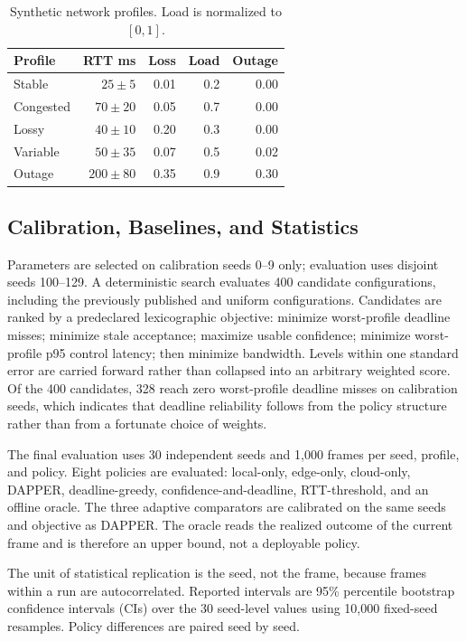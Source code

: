 \documentclass[conference,a4paper]{IEEEtran}
\begin{document}
\begin{table}[t]
\centering
\caption{Synthetic network profiles. Load is normalized to $[0,1]$.}
\label{tab:profiles}
\scriptsize
\renewcommand{\arraystretch}{0.9}
\begin{tabular}{@{}lrrrr@{}}
\toprule
Profile & RTT ms & Loss & Load & Outage \\
\midrule
Stable    & $25\pm5$   & 0.01 & 0.2 & 0.00 \\
Congested & $70\pm20$  & 0.05 & 0.7 & 0.00 \\
Lossy     & $40\pm10$  & 0.20 & 0.3 & 0.00 \\
Variable  & $50\pm35$  & 0.07 & 0.5 & 0.02 \\
Outage    & $200\pm80$ & 0.35 & 0.9 & 0.30 \\
\bottomrule
\end{tabular}
\end{table}

\subsection{Calibration, Baselines, and Statistics}
Parameters are selected on calibration seeds 0--9 only; evaluation uses disjoint seeds 100--129. A deterministic search evaluates 400 candidate configurations, including the previously published and uniform configurations. Candidates are ranked by a predeclared lexicographic objective: minimize worst-profile deadline misses; minimize stale acceptance; maximize usable confidence; minimize worst-profile p95 control latency; then minimize bandwidth. Levels within one standard error are carried forward rather than collapsed into an arbitrary weighted score. Of the 400 candidates, 328 reach zero worst-profile deadline misses on calibration seeds, which indicates that deadline reliability follows from the policy structure rather than from a fortunate choice of weights.

The final evaluation uses 30 independent seeds and 1,000 frames per seed, profile, and policy. Eight policies are evaluated: local-only, edge-only, cloud-only, DAPPER, deadline-greedy, confidence-and-deadline, RTT-threshold, and an offline oracle. The three adaptive comparators are calibrated on the same seeds and objective as DAPPER. The oracle reads the realized outcome of the current frame and is therefore an upper bound, not a deployable policy.

The unit of statistical replication is the seed, not the frame, because frames within a run are autocorrelated. Reported intervals are 95\% percentile bootstrap confidence intervals (CIs) over the 30 seed-level values using 10,000 fixed-seed resamples. Policy differences are paired seed by seed.
\end{document}
